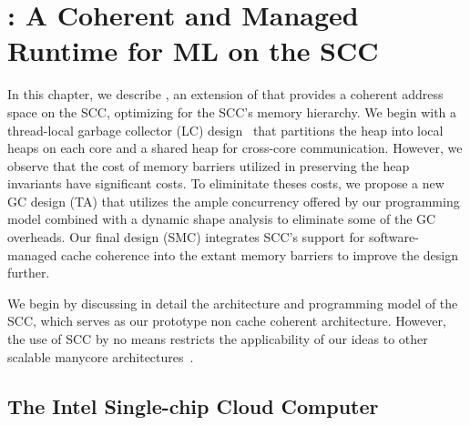 \newcommand{\lc}{LC}
\newcommand{\ta}{TA}
\newcommand{\smc}{SMC}
\newcommand{\kcore}{k_{core}}
\newcommand{\kmesh}{k_{mesh}}
\newcommand{\kram}{k_{ram}}

\chapter{\MMSCC: A Coherent and Managed Runtime for ML on the SCC}

In this chapter, we describe \MMSCC, an extension of \MM that provides a
coherent address space on the SCC, optimizing for the SCC's memory hierarchy.
We begin with a thread-local garbage collector (\lc) design~\cite{} that
partitions the heap into local heaps on each core and a shared heap for
cross-core communication. However, we observe that the cost of memory barriers
utilized in preserving the heap invariants have significant costs. To
eliminitate theses costs, we propose a new GC design (\ta) that utilizes the
ample concurrency offered by our programming model combined with a dynamic
shape analysis to eliminate some of the GC overheads. Our final design (\smc)
integrates SCC's support for software-managed cache coherence into the extant
memory barriers to improve the design further.


We begin by discussing in detail the architecture and programming model of the
SCC, which serves as our prototype non cache coherent architecture. However,
the use of SCC by no means restricts the applicability of our ideas to other
scalable manycore architectures~\cite{mmgc}.

\section{The Intel Single-chip Cloud Computer}

